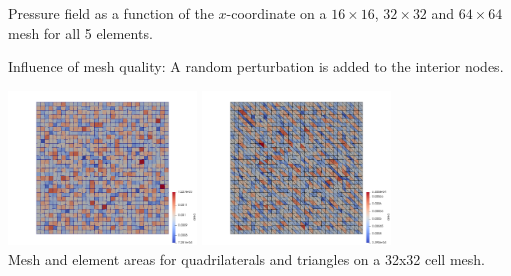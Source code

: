 \begin{center}
{\captionfont Pressure field as a function of the $x$-coordinate on a $16\times16$,
$32\times 32$ and $64\times 64$ mesh for all 5 elements.} 
\end{center}

\newpage

Influence of mesh quality:
A random perturbation is added to the interior nodes. 

\begin{center}
\includegraphics[width=5cm]{python_codes/fieldstone_112/results/exp1_rand/area_quads}
\includegraphics[width=5cm]{python_codes/fieldstone_112/results/exp1_rand/area_tris}\\
{\captionfont Mesh and element areas for quadrilaterals and triangles on a 32x32 cell mesh.}
\end{center}

